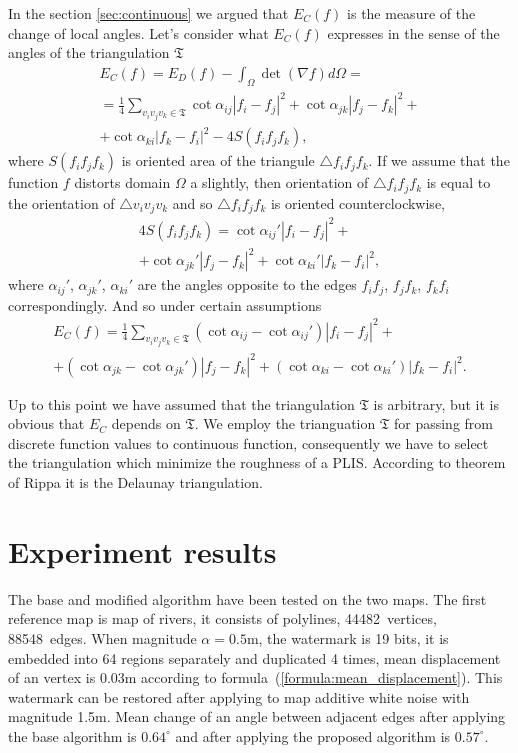 \documentclass{article}
\begin{document}
In the section \ref{sec:continuous} we argued that $E_C(f)$ is the measure of the change of local angles. 
Let's consider what $E_C(f)$ expresses in the sense of the angles of the triangulation $\mathfrak{T}$ 
\begin{multline*}
  E_C(f) = E_D(f) - \int_{\Omega} \det (\nabla f) d\Omega = \\ 
  = \frac{1}{4} \sum_{v_i v_j v_k \in \mathfrak{T}} \cot{\alpha_{ij}}|f_i - f_j|^2 + \cot{\alpha_{jk}}|f_j - f_k|^2 + \\ 
  + \cot{\alpha_{ki}}|f_k - f_i|^2 - 4S(f_i f_j f_k),
\end{multline*}
where $S(f_i f_j f_k)$ is oriented area of the triangule $\triangle f_i f_j f_k$. If we assume that the function $f$ distorts domain $\Omega$ a slightly, 
then orientation of $\triangle f_i f_j f_k$ is equal to the orientation of $\triangle v_i v_j v_k$ and so $\triangle f_i f_j f_k$ is oriented counterclockwise,
\begin{multline*}
  4 S(f_i f_j f_k) = \cot{\alpha_{ij}'}|f_i - f_j|^2 + \\ + \cot{\alpha_{jk}'}|f_j - f_k|^2 + \cot{\alpha_{ki}'}|f_k - f_i|^2,
\end{multline*}
where $\alpha_{ij}'$, $\alpha_{jk}'$, $\alpha_{ki}'$ are the angles opposite to the edges $f_i f_j$, $f_j f_k$, $f_k f_i$ correspondingly. 
And so under certain assumptions
\begin{multline*}
  E_C(f) = \frac{1}{4} \sum_{v_i v_j v_k \in \mathfrak{T}} (\cot{\alpha_{ij}} - \cot{\alpha_{ij}'})|f_i - f_j|^2 + \\
  + (\cot{\alpha_{jk}} - \cot{\alpha_{jk}'})|f_j - f_k|^2 + (\cot{\alpha_{ki}} - \cot{\alpha_{ki}'})|f_k - f_i|^2.
\end{multline*}

Up to this point we have assumed that the triangulation $\mathfrak{T}$ is arbitrary, but it is obvious that $E_C$ depends on $\mathfrak{T}$. 
We employ the trianguation $\mathfrak{T}$ for passing from discrete function values to continuous function, consequently we have to select 
the triangulation which minimize the roughness of a PLIS. According to theorem of Rippa \cite{Rippa, Chen} it is the Delaunay triangulation.  

\section{Experiment results}
\label{sec:results}
The base and modified algorithm have been tested on the two maps. The first reference map is map of rivers, it consists of polylines, 44482~vertices, 88548~edges. When magnitude $\alpha = 0.5$m, 
the watermark is 19 bits, it is embedded into 64 regions separately and duplicated 4 times, mean displacement of an vertex is 0.03m according to formula~(\ref{formula:mean_displacement}). This watermark can be restored
after applying to map additive white noise with magnitude 1.5m. Mean change of an angle between adjacent edges after applying the base algorithm is $0.64^\circ$ and after applying the proposed algorithm is $0.57^\circ$.
\end{document}
